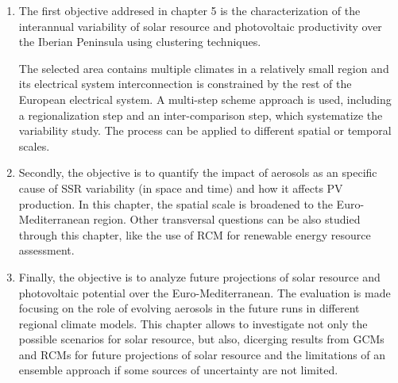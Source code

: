 \begin{enumerate}
\item The first objective addresed in chapter 5 is the characterization of the interannual variability of solar resource and photovoltaic productivity over the Iberian Peninsula using clustering techniques.

  The selected area contains multiple climates in a relatively small region and its electrical system interconnection is constrained by the rest of the European electrical system. A multi-step scheme approach is used, including a regionalization step and an inter-comparison step, which systematize the variability study. The process can be applied to different spatial or temporal scales.

\item Secondly, the objective is to quantify the impact of aerosols as an specific cause of SSR variability (in space and time)  and how it affects PV production. In this chapter, the spatial scale is broadened to the Euro-Mediterranean region. Other transversal questions can be also studied through this chapter, like the use of RCM for renewable energy resource assessment.

\item Finally, the objective is to analyze future projections  of solar resource and photovoltaic potential over the Euro-Mediterranean. The evaluation is made focusing on the role of evolving aerosols in the future runs in different regional climate models. This chapter allows to investigate not only the possible scenarios for solar resource, but also, dicerging results from GCMs and RCMs for future projections of solar resource and the limitations of an ensemble approach if some sources of uncertainty are not limited.

\end{enumerate}  





% 